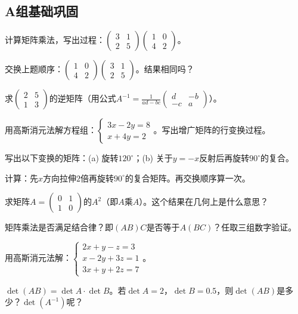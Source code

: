 
\subsection*{A组\quad 基础巩固}

\begin{exercise}
\item 计算矩阵乘法，写出过程：$\begin{pmatrix}3&1\\2&5\end{pmatrix}\begin{pmatrix}1&0\\4&2\end{pmatrix}$。
\item 交换上题顺序：$\begin{pmatrix}1&0\\4&2\end{pmatrix}\begin{pmatrix}3&1\\2&5\end{pmatrix}$。结果相同吗？
\item 求$\begin{pmatrix}2&5\\1&3\end{pmatrix}$的逆矩阵（用公式$A^{-1}=\frac{1}{ad-bc}\begin{pmatrix}d&-b\\-c&a\end{pmatrix}$）。
\item 用高斯消元法解方程组：$\begin{cases}3x-2y=8\\x+4y=2\end{cases}$。写出增广矩阵的行变换过程。
\item 写出以下变换的矩阵：(a) 旋转$120^\circ$；(b) 关于$y=-x$反射后再旋转$90^\circ$的复合。
\item 计算：先$x$方向拉伸$2$倍再旋转$90^\circ$的复合矩阵。再交换顺序算一次。
\item 求矩阵$A=\begin{pmatrix}0&1\\1&0\end{pmatrix}$的$A^2$（即$A$乘$A$）。这个结果在几何上是什么意思？
\item 矩阵乘法是否满足结合律？即$(AB)C$是否等于$A(BC)$？任取三组数字验证。
\item 用高斯消元法解：$\begin{cases}2x+y-z=3\\x-2y+3z=1\\3x+y+2z=7\end{cases}$。
\item $\det(AB)=\det A\cdot\det B$。若$\det A=2$，$\det B=0.5$，则$\det(AB)$是多少？$\det(A^{-1})$呢？
\end{exercise}

